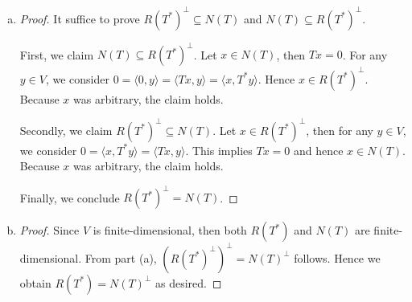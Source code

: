 \begin{Exercise}
\begin{enumerate}[(a)]
\item
\begin{proof}
It suffice to prove $R(T^*)^{\perp} \subseteq N(T)$ and $N(T) \subseteq R(T^*)^{\perp}$.

First, we claim $N(T) \subseteq R(T^*)^{\perp}$. Let $x\in N(T)$, then $T x = 0$. For any $y\in V$, we consider $
0 = \langle 0, y \rangle = \langle T x , y \rangle = \langle x, T^* y \rangle$. Hence $x\in R(T^*)^{\perp}$. Because $x$ was arbitrary, the claim holds.

Secondly, we claim $R(T^*)^{\perp} \subseteq N(T)$. Let $x\in R(T^*)^{\perp}$, then for any $y\in V$, we consider $0 = \langle x, T^* y \rangle = \langle T x, y \rangle$. This implies $T x = 0$ and hence $x\in N(T)$. Because $x$ was arbitrary, the claim holds.

Finally, we conclude $R(T^*)^{\perp} = N(T)$.
\end{proof}

\item
\begin{proof}
Since $V$ is finite-dimensional, then both $R(T^*)$ and $N(T)$ are finite-dimensional. From part (a), $(R(T^*)^{\perp})^{\perp} = N(T)^{\perp}$ follows. Hence we obtain $R(T^*) = N(T)^{\perp}$ as desired.
\end{proof}
\end{enumerate}
\end{Exercise}
